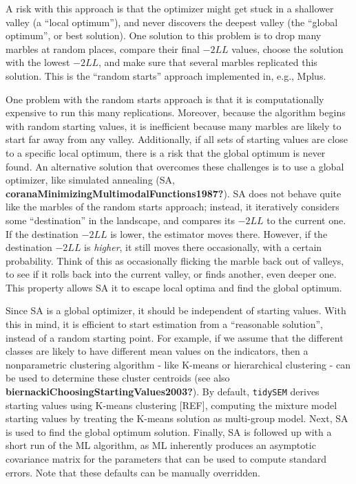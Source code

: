 \documentclass[
  ,man,floatsintext]{apa6}
\begin{document}
A risk with this approach is that the optimizer might get stuck in a shallower valley (a ``local optimum''),
and never discovers the deepest valley (the ``global optimum'', or best solution).
One solution to this problem is to drop many marbles at random places,
compare their final \(-2LL\) values,
choose the solution
with the lowest \(-2LL\), and make sure that several marbles replicated
this solution.
This is the ``random starts'' approach implemented in, e.g., Mplus.

One problem with the random starts approach is that it is
computationally expensive to run this many replications. Moreover,
because the algorithm begins with random starting values,
it is inefficient because many marbles are likely to start far away from any valley.
Additionally, if all sets of starting values are close to a specific local optimum,
there is a risk that the global optimum is never found.
An alternative solution that overcomes these challenges is to use a global optimizer, like simulated annealing (SA, \textbf{coranaMinimizingMultimodalFunctions1987?}).
SA does not behave quite like the marbles of the random starts approach;
instead, it iteratively considers some ``destination'' in the landscape,
and compares its \(-2LL\) to the current one.
If the destination \(-2LL\) is lower,
the estimator moves there.
However, if the destination \(-2LL\) is \emph{higher},
it still moves there occasionally, with a certain probability.
Think of this as occasionally flicking the marble back out of valleys,
to see if it rolls back into the current valley, or finds another,
even deeper one.
This property allows SA it to escape local optima and find the global optimum.

Since SA is a global optimizer, it should be independent of starting values.
With this in mind, it is efficient to start estimation from a ``reasonable solution'', instead of a random starting point.
For example, if we assume that the different classes are likely to have different mean values on the indicators,
then a nonparametric clustering algorithm - like K-means or hierarchical clustering - can be used to determine these cluster centroids (see also \textbf{biernackiChoosingStartingValues2003?}).
By default, \texttt{tidySEM} derives starting values using K-means clustering {[}REF{]},
computing the mixture model starting values by treating the K-means solution as multi-group model.
Next, SA is used to find the global optimum solution.
Finally, SA is followed up with a short run of the ML algorithm,
as ML inherently produces an asymptotic
covariance matrix for the parameters that can be used to compute
standard errors.
Note that these defaults can be manually overridden.
\end{document}
